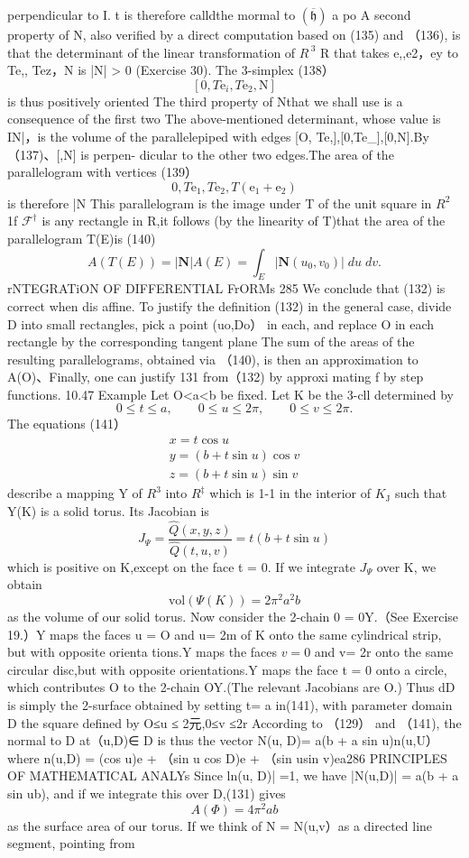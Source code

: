 perpendicular to I. t is therefore calldthe mormal to $({\overline{{\mathfrak{h}}}})$ a po A second property of N, also verified by a direct computation based on (135) and （136), is that the determinant of the linear transformation of $R^{\ 3}$ R that takes {e,,e2，ey} to {Te,, Tez，N} is |N| > 0 (Exercise 30). The 3-simplex (138） $$ [0,T\mathrm{e}_{i},T\mathrm{e}_{2},\mathrm{N}] $$ is thus positively oriented The third property of Nthat we shall use is a consequence of the first two The above-mentioned determinant, whose value is IN|，is the volume of the parallelepiped with edges [O, Te,],[0,Te_],[0,N].By（137)、[,N] is perpen- dicular to the other two edges.The area of the parallelogram with vertices (139） $$ 0,T\mathrm{e}_{1},T\mathrm{e}_{2},T(\mathrm{e}_{1}+\mathrm{e}_{2}) $$ is therefore |N This parallelogram is the image under T of the unit square in $R^{2}$ 1f ${\mathcal{F}}^{\dagger}$ is any rectangle in R,it follows (by the linearity of T)that the area of the parallelogram T(E)is (140) $$ A(T(E))=|\mathbf{N}|A(E)=\int_{E}|\mathbf{N}(u_{0},v_{0})|\;d u\;d v. $$rNTEGRATiON OF DIFFERENTIAL FrORMs 285 We conclude that (132) is correct when dis affine. To justify the definition (132) in the general case, divide D into small rectangles, pick a point (uo,Do） in each, and replace O in each rectangle by the corresponding tangent plane The sum of the areas of the resulting parallelograms, obtained via （140), is then an approximation to A(O)、Finally, one can justify 131 from（132) by approxi mating f by step functions. 10.47 Example Let O<a<b be fixed. Let K be the 3-cll determined by $$ 0\leq t\leq a,\qquad0\leq u\leq2\pi,\qquad0\leq v\leq2\pi. $$ The equations (141） $$ \begin{array}{l}{{x=t\cos u}}\\ {{y=(b+t\sin u)\cos v}}\\ {{z=(b+t\sin u)\sin v}}\end{array} $$ describe a mapping Y of $\textstyle R^{3}$ into $R^{\ddagger}$ which is 1-1 in the interior of $K_{\mathrm{{J}}}$ such that Y(K) is a solid torus. Its Jacobian is $$ J_{\Psi}=\frac{\hat{Q}(x,y,z)}{\hat{Q}(t,u,v)}=t(b+t\sin u) $$ which is positive on K,except on the face t = 0. If we integrate $J_{\Psi}$ over K, we obtain $$ \mathrm{vol}\left(\Psi(K)\right)=2\pi^{2}a^{2}b $$ as the volume of our solid torus. Now consider the 2-chain 0 = 0Y.（See Exercise 19.）Y maps the faces u = O and u= 2m of K onto the same cylindrical strip, but with opposite orienta tions.Y maps the faces $v=0$ and v= 2r onto the same circular disc,but with opposite orientations.Y maps the face t = 0 onto a circle, which contributes O to the 2-chain OY.(The relevant Jacobians are O.) Thus dD is simply the 2-surface obtained by setting t= a in(141), with parameter domain D the square defined by O≤u ≤ 2元,0≤v ≤2r According to （129） and （141), the normal to D at（u,D)∈ D is thus the vector N(u, D)= a(b + a sin u)n(u,U） where n(u,D) = (cos u)e + （sin u cos D)e + （sin usin v)ea286 PRINCIPLES OF MATHEMATICAL ANALYs Since ln(u, D)| =1, we have |N(u,D)| = a(b + a sin ub), and if we integrate this over D,(131) gives $$ A(\Phi)=4\pi^{2}a b $$ as the surface area of our torus. If we think of N = N(u,v）as a directed line segment, pointing from 